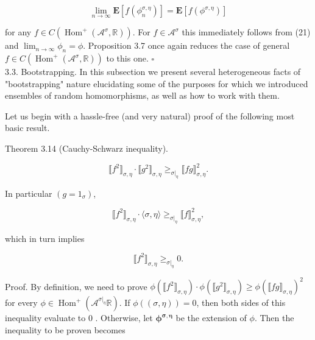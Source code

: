 \documentclass[10pt]{article}
\begin{document}
$$
\lim _{n \rightarrow \infty} \mathbf{E}\left[f\left(\phi_{n}^{\sigma, \eta}\right)\right]=\mathbf{E}\left[f\left(\phi^{\sigma, \eta}\right)\right]
$$

for any $f \in C\left(\operatorname{Hom}^{+}\left(\mathcal{A}^{\sigma}, \mathbb{R}\right)\right)$. For $f \in \mathcal{A}^{\sigma}$ this immediately follows from (21) and $\lim _{n \rightarrow \infty} \phi_{n}=\phi$. Proposition 3.7 once again reduces the case of general $f \in C\left(\operatorname{Hom}^{+}\left(\mathcal{A}^{\sigma}, \mathbb{R}\right)\right)$ to this one. \(\square\)\\
3.3. Bootstrapping. In this subsection we present several heterogeneous facts of "bootstrapping" nature elucidating some of the purposes for which we introduced ensembles of random homomorphisms, as well as how to work with them.

Let us begin with a hassle-free (and very natural) proof of the following most basic result.

Theorem 3.14 (Cauchy-Schwarz inequality).

$$
\llbracket f^{2} \rrbracket_{\sigma, \eta} \cdot \llbracket g^{2} \rrbracket_{\sigma, \eta} \geq_{\left.\sigma\right|_{\eta}} \llbracket f g \rrbracket_{\sigma, \eta}^{2} .
$$

In particular $\left(g=1_{\sigma}\right)$,


\begin{equation*}
\llbracket f^{2} \rrbracket_{\sigma, \eta} \cdot\langle\sigma, \eta\rangle \geq_{\left.\sigma\right|_{\eta}} \llbracket f \rrbracket_{\sigma, \eta}^{2}, \tag{22}
\end{equation*}


which in turn implies


\begin{equation*}
\llbracket f^{2} \rrbracket_{\sigma, \eta} \geq_{\left.\sigma\right|_{\eta}} 0 . \tag{23}
\end{equation*}


Proof. By definition, we need to prove $\phi\left(\llbracket f^{2} \rrbracket_{\sigma, \eta}\right) \cdot \phi\left(\llbracket g^{2} \rrbracket_{\sigma, \eta}\right) \geq \phi\left(\llbracket f g \rrbracket_{\sigma, \eta}\right)^{2}$ for every $\phi \in \operatorname{Hom}^{+}\left(\mathcal{A}^{\left.\sigma\right|_{\eta}} \mathbb{R}\right)$. If $\phi((\sigma, \eta))=0$, then both sides of this inequality evaluate to 0 . Otherwise, let $\boldsymbol{\phi}^{\boldsymbol{\sigma}, \boldsymbol{\eta}}$ be the extension of $\phi$. Then the inequality to be proven becomes
\end{document}
